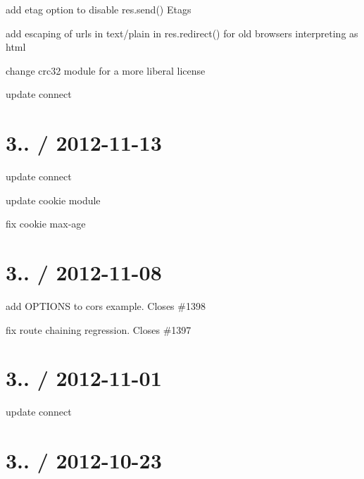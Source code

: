 \begin{DoxyItemize}
\item add \textquotesingle{}etag\textquotesingle{} option to disable {\ttfamily res.\+send()} Etags
\item add escaping of urls in text/plain in {\ttfamily res.\+redirect()} for old browsers interpreting as html
\item change crc32 module for a more liberal license
\item update connect
\end{DoxyItemize}

\section*{3.. / 2012-\/11-\/13 }


\begin{DoxyItemize}
\item update connect
\item update cookie module
\item fix cookie max-\/age
\end{DoxyItemize}

\section*{3.. / 2012-\/11-\/08 }


\begin{DoxyItemize}
\item add O\+P\+T\+I\+O\+N\+S to cors example. Closes \#1398
\item fix route chaining regression. Closes \#1397
\end{DoxyItemize}

\section*{3.. / 2012-\/11-\/01 }


\begin{DoxyItemize}
\item update connect
\end{DoxyItemize}

\section*{3.. / 2012-\/10-\/23 }


